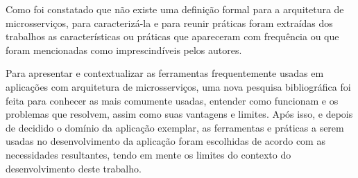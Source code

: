 Como foi constatado que não existe uma definição formal para a arquitetura de microsserviços, para caracterizá-la e para reunir práticas foram extraídas dos trabalhos as características ou práticas que apareceram com frequência ou que foram mencionadas como imprescindíveis pelos autores. 

Para apresentar e contextualizar as ferramentas frequentemente usadas em aplicações com arquitetura de microsserviços, uma nova pesquisa bibliográfica foi feita para conhecer as mais comumente usadas, entender como funcionam e os problemas que resolvem, assim como suas vantagens e limites. Após isso, e depois de decidido o domínio da aplicação exemplar, as ferramentas e práticas a serem usadas no desenvolvimento da aplicação foram escolhidas de acordo com as necessidades resultantes, tendo em mente os limites do contexto do desenvolvimento deste trabalho. 
 


